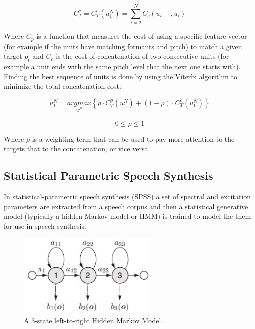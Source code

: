 \begin{equation}
    C_T^c = C_T^c (u_1^N) = \sum_{i = 2}^{N} C_c (u_{i-1}, u_i) 
    \label{eq:concat-cost}
\end{equation}

Where $C_p$ is a function that measures the cost of using a specific feature vector (for example if the units have matching formants and pitch) to match a given target $p_t$ and $C_c$ is the cost of concatenation of two consecutive units (for example a unit ends with the same pitch level that the next one starts with). Finding the best sequence of units is done by using the Viterbi algorithm to minimize the total concatenation cost:

\begin{equation}
    u_1^N= \underset{u_1^N}{argmax} \left \{ \rho \cdot C_T^p (u_1^N) + (1-\rho) \cdot C_T^c (u_1^N) \right \}
    \label{eq:unit-cost}
\end{equation}

\begin{equation}
    0 \le \rho \le 1
\end{equation}

Where $\rho$ is a weighting term that can be used to pay more attention to the targets that to the concatenation, or vice versa.

\subsection{Statistical Parametric Speech Synthesis}

In statistical-parametric speech synthesis (SPSS) a set of spectral and excitation parameters are extracted from a speech corpus and then a statistical generative model (typically a hidden Markov model or HMM) is trained to model the them for use in speech synthesis.

\begin{figure}[h]
    \centering
    \includegraphics[height=4cm]{figures/hmm}
    \caption{A 3-state left-to-right Hidden Markov Model.}
    \label{fig:hmm}
\end{figure}

